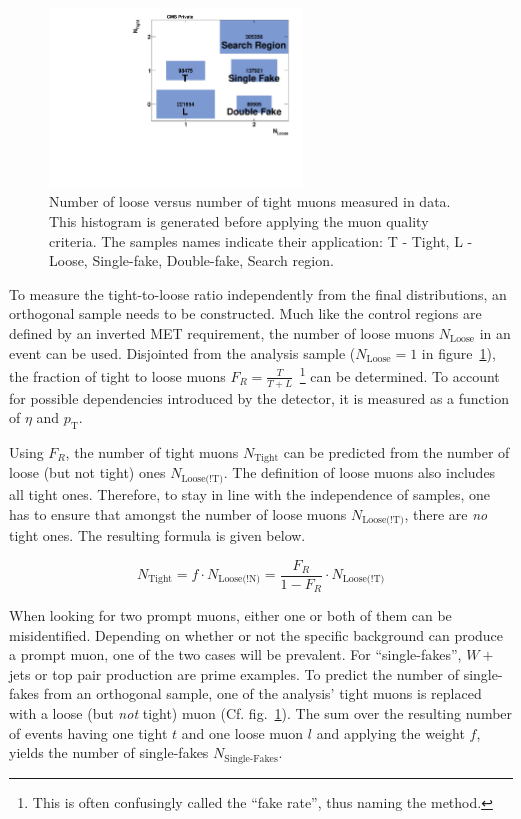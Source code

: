 \begin{figure}[ht!]
  \centering
    \includegraphics[width=0.6\textwidth]{plots/nloosetight.pdf}
  \caption{Number of loose versus number of tight muons measured in data. This histogram is generated before applying the muon quality criteria. The samples names indicate their application: T - Tight, L - Loose, Single-fake, Double-fake, Search region.}
  \label{fig:nloosetight}
\end{figure}

To measure the tight-to-loose ratio independently from the final distributions, an orthogonal sample needs to be constructed. Much like the control regions are defined by an inverted MET requirement, the number of loose muons $N_{\text{Loose}}$ in an event can be used. Disjointed from the analysis sample ($N_{\text{Loose}} = 1$ in figure~\ref{fig:nloosetight}), the fraction of tight to loose muons $F_R = \frac{T}{T+L}$~\footnote{This is often confusingly called the ``fake rate'', thus naming the method.} can be determined. To account for possible dependencies introduced by the detector, it is measured as a function of $\eta$ and $p_{\text{T}}$. 

Using $F_R$, the number of tight muons $N_{\text{Tight}}$ can be predicted from the number of loose (but not tight) ones $N_{\text{Loose(!T)}}$. The definition of loose muons also includes all tight ones. Therefore, to stay in line with the independence of samples, one has to ensure that amongst the number of loose muons $N_{\text{Loose(!T)}}$, there are \textit{no} tight ones. The resulting formula is given below.

\begin{equation}
  \label{eq:fakerate}
  N_{\text{Tight}} = f \cdot N_{\text{Loose(!N)}} = \frac{F_R }{1 - F_R} \cdot N_{\text{Loose(!T)}}
\end{equation}

When looking for two prompt muons, either one or both of them can be misidentified. Depending on whether or not the specific background can produce a prompt muon, one of the two cases will be prevalent. For ``single-fakes'', $W +$ jets or top pair production are prime examples. To predict the number of single-fakes from an orthogonal sample, one of the analysis' tight muons is replaced with a loose (but \textit{not} tight) muon (Cf. fig.~\ref{fig:nloosetight}). The sum over the resulting number of events having one tight $t$ and one loose muon $l$ and applying the weight $f$, yields the number of single-fakes $N_{\text{Single-Fakes}}$.

